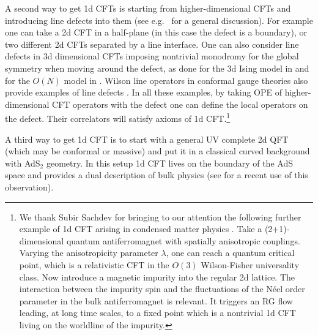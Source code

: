 \documentclass[12pt]{article}
\numberwithin{equation}{section}
\begin{document}
A second way to get 1d CFTs is starting from higher-dimensional CFTs and introducing line defects into them (see e.g.~\cite{Billo:2016cpy} for a general discussion). For example one can take a 2d CFT in a half-plane (in this case the defect is a boundary), or two different 2d CFTs separated by a line interface. One can also consider line defects in 3d dimensional CFTs imposing nontrivial monodromy for the global symmetry when moving around the defect, as done for the 3d Ising model in \cite{Billo:2013jda,Gaiotto:2013nva} and for the $O(N)$ model in \cite{Soderberg:2017oaa}. Wilson line operators in conformal gauge theories also provide examples of line defects \cite{Giombi:2017cqn}. In all these examples, by taking OPE of higher-dimensional CFT operators with the defect one can define the local operators on the defect. Their correlators will satisfy axioms of 1d CFT.\footnote{We thank Subir Sachdev for bringing to our attention the following further example of 1d CFT arising in condensed matter physics \cite{Sachdev1,Sachdev2,Sachdev:2001ky}. Take a (2+1)-dimensional quantum antiferromagnet with spatially anisotropic couplings. Varying the anisotropicity parameter $\lambda$, one can reach a quantum critical point, which is a relativistic CFT in the $O(3)$ Wilson-Fisher universality class. Now introduce a magnetic impurity into the regular 2d lattice. The interaction between the impurity spin and the fluctuations of the N\'eel order parameter in the bulk antiferromagnet is relevant. It triggers an RG flow leading, at long time scales, to a fixed point which is a nontrivial 1d CFT living on the worldline of the impurity.}

A third way to get 1d CFT is to start with a general UV complete 2d QFT (which may be conformal or massive) and put it in a classical curved background with AdS${}_2$ geometry. In this setup 1d CFT lives on the boundary of the AdS space and provides a dual description of bulk physics (see \cite{Paulos:2016fap} for a recent use of this observation).
\end{document}
